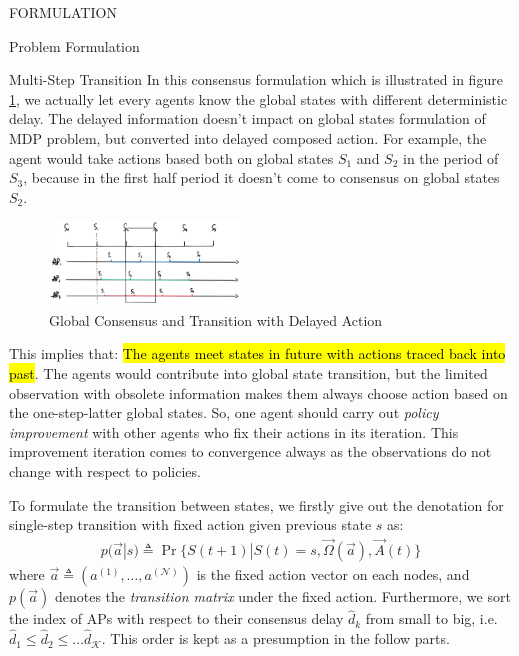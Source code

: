 \documentclass[10pt, conference, letterpaper]{IEEEtran}
\begin{document}
\begin{section}{FORMULATION}
\begin{subsection}{Problem Formulation}
\begin{subsubsection}{Multi-Step Transition}
                In this consensus formulation which is illustrated in figure \ref{fig:br-trans}, we actually let every agents know the global states with different deterministic delay. The delayed information doesn't impact on global states formulation of MDP problem, but converted into delayed composed action. For example, the agent would take actions based both on global states $S_1$ and $S_2$ in the period of $S_3$, because in the first half period it doesn't come to consensus on global states $S_2$.

                \begin{figure}[h]
                    \centering
                    \includegraphics[width=0.45\textwidth]{broadcast-trans.png}
                    \caption{Global Consensus and Transition with Delayed Action}
                    \label{fig:br-trans}
                \end{figure}

                This implies that: \hl{The agents meet states in future with actions traced back into past}. The agents would contribute into global state transition, but the limited observation with obsolete information makes them always choose action based on the one-step-latter global states. So, one agent should carry out \emph{policy improvement} with other agents who fix their actions in its iteration. This improvement iteration comes to convergence always as the observations do not change with respect to policies.

                To formulate the transition between states, we firstly give out the denotation for single-step transition with fixed action given previous state $s$ as:
                \begin{align}
                    p(\vec{a}|s) \triangleq \Pr\{ S(t+1)|S(t)=s, \vec{\Omega}(\vec{a}),\vec{A}(t) \}
                \end{align}
                where $\vec{a} \triangleq (a^{(1)}, \dots, a^{(\mathcal{N})})$ is the fixed action vector on each nodes, and $p(\vec{a})$ denotes the \emph{transition matrix} under the fixed action. Furthermore, we sort the index of APs with respect to their consensus delay $\hat{d}_k$ from small to big, i.e. $\hat{d}_1 \leq \hat{d}_2 \leq \dots \hat{d}_{\mathcal{K}}$. This order is kept as a presumption in the follow parts.


\end{subsubsection}
\end{subsection}
\end{section}
\end{document}
